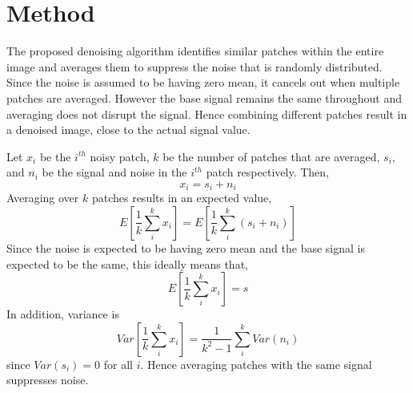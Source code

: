 \documentclass[fleqn,10pt]{wlscirep}
\begin{document}
	
	\section*{Method}
	
	The proposed denoising algorithm identifies similar patches within the entire image and averages them to suppress the noise that is randomly distributed. Since the noise is assumed to be having zero mean, it cancels out when multiple patches are averaged. However the base signal remains the same throughout and averaging does not disrupt the signal. Hence combining different patches result in a denoised image, close to the actual signal value. 
	
	Let $x_{i}$ be the $i^{th}$ noisy patch, $k$ be the number of patches that are averaged, $s_i$, and $n_i$ be the signal and noise in the $i^{th}$ patch respectively. Then,
	\begin{equation}
		x_i = s_i + n_i
	\end{equation}
	Averaging over $k$ patches results in an expected value,
	\begin{equation}
		E[\frac{1}{k}\sum_{i}^{k}x_i ] = E[\frac{1}{k}\sum_{i}^{k}(s_i + n_i) ]
	\end{equation}
	Since the noise is expected to be having zero mean and the base signal is expected to be the same, this ideally means that,
	\begin{equation}
		E[\frac{1}{k}\sum_{i}^{k}x_i ] = s
	\end{equation}
	In addition, variance is 
	\begin{equation}
		Var[\frac{1}{k}\sum_{i}^{k}x_i ] = \frac{1}{k^2 -1} \sum_{i}^{k}Var(n_i)
	\end{equation}
	since $Var(s_i) = 0$ for all $i$. Hence averaging patches with the same signal suppresses noise.
	
	
	
\end{document}
